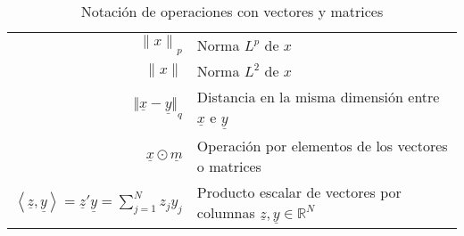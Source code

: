 \begin{table}[H]
\begin{center}
\begin{tabularx}{\textwidth}{|r|X|}
            $ {\lVert x \rVert}_{p} $                                                                                            & Norma $L^{p}$ de $x$                                                                        \\
            $ {\lVert x \rVert} $                                                                                                & Norma $L^{2}$ de $x$                                                                        \\
            $ {\Vert \underline{x} - \underline{y} \Vert}_{q} $                                                                  & Distancia en la misma dimensión entre $\underline{x}$ e $\underline{y}$                     \\
            $ \underline{x} \odot \underline{m} $                                                                                & Operación por elementos de los vectores o matrices                                          \\
            $ \left\langle \underline{z}, \underline{y} \right\rangle = \underline{z}' \underline{y} = \sum_{j=1}^{N}{z_j y_j} $ & Producto escalar de vectores por columnas $\underline{z}, \underline{y} \in \mathbb{R}^{N}$ \\
            \hline
        \end{tabularx}
        \caption{Notación de operaciones con vectores y matrices}
        \label{tab:nnotation-part-operations-v-m}
    \end{center}
\end{table}


